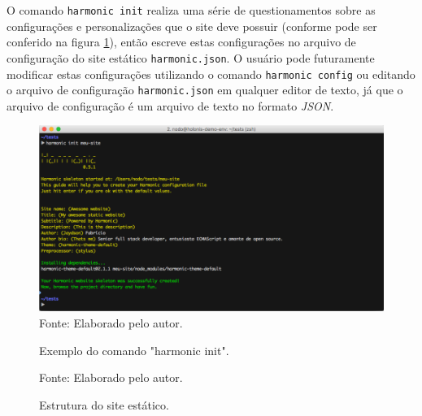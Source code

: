 \documentclass[ppginf, pep]{esinucpel}
\newcommand{\code}[1]{\texttt{#1}}
\begin{document}
O comando \code{harmonic init} realiza uma série de questionamentos sobre as configurações e personalizações que o site deve possuir (conforme pode ser conferido na figura \ref{fig:harmonic_init}), então escreve estas configurações no arquivo de configuração do site estático \code{harmonic.json}. O usuário pode futuramente modificar estas configurações utilizando o comando \code{harmonic config} ou editando o arquivo de configuração \code{harmonic.json} em qualquer editor de texto, já que o arquivo de configuração é um arquivo de texto no formato \emph{JSON}.

\begin{figure}[H]
    \centering
    \caption{Exemplo do comando "harmonic init".}
    \vspace{5pt}
    \includegraphics[width=\textwidth]{harmonic_init}
    \\Fonte: Elaborado pelo autor.
    \label{fig:harmonic_init}
\end{figure}

\begin{figure}[H]
    \caption{Estrutura do site estático.}
    \vspace{5pt}
    \centering
    Fonte: Elaborado pelo autor.
    \label{fig:estrutura_harmonic}
\end{figure}
\end{document}
